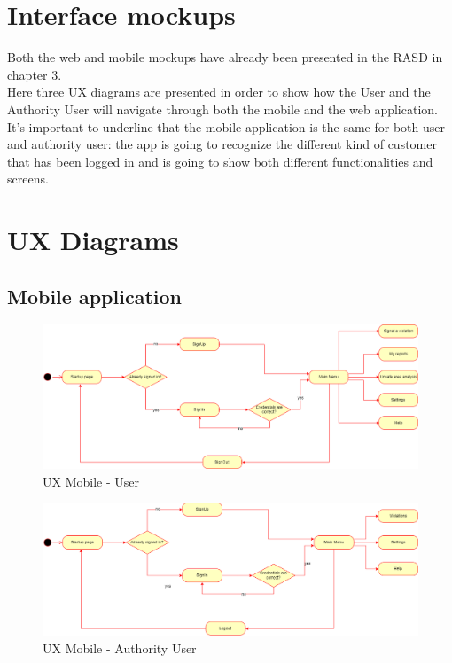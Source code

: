     \section{Interface mockups}
    Both the web and mobile mockups have already been presented in the RASD in
    chapter 3. \\
    Here three UX diagrams are presented in order to show how the User and the
    Authority User will navigate through both the mobile and the web
    application. It's important to underline that the mobile application is the
    same for both user and authority user: the app is going to recognize the
    different kind of customer that has been logged in and is going to show both
    different functionalities and screens.

    \section{UX Diagrams}
        \subsection{Mobile application}
        \begin{figure}[H]
            \includegraphics[scale = 0.35]{dd/resources/images/UX-diagram-mobile-user.png}
            \caption{UX Mobile - User}        
        \end{figure}   
        \begin{figure}[H]
            \includegraphics[scale = 0.35]{dd/resources/images/UX-diagram-mobile-authorityUser.png}
            \caption{UX Mobile - Authority User}        
        \end{figure}             
